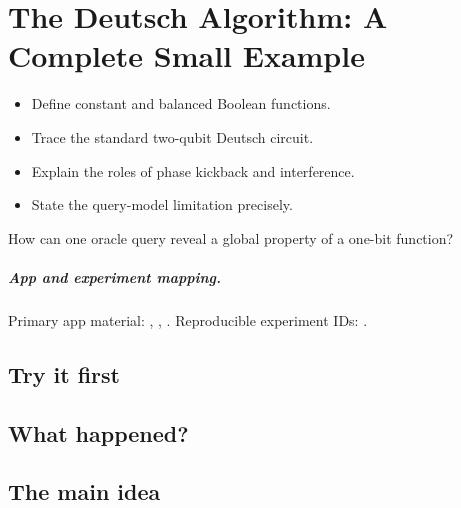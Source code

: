 \chapter[The Deutsch Algorithm]{The Deutsch Algorithm: A Complete Small Example}
\label{chap:the-deutsch-algorithm-a-complete-small-example}

\begin{learningobjectives}
\begin{itemize}
  \item Define constant and balanced Boolean functions.
  \item Trace the standard two-qubit Deutsch circuit.
  \item Explain the roles of phase kickback and interference.
  \item State the query-model limitation precisely.
\end{itemize}
\end{learningobjectives}

\begin{openingquestion}
How can one oracle query reveal a global property of a one-bit function?
\end{openingquestion}

\paragraph{App and experiment mapping.}
Primary app material: , , . Reproducible experiment IDs:
.

\section{Try it first}
\begin{tryit}
\end{tryit}

\section{What happened?}

\section{The main idea}
\begin{coreidea}
\end{coreidea}

